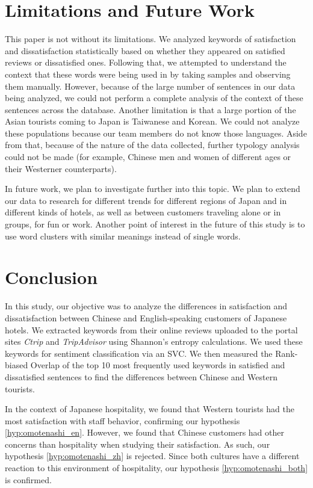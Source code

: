 \documentclass[smallextended,natbib]{svjour3}       %
\begin{document}
\section{Limitations and Future Work}\label{limitations}

This paper is not without its limitations. We analyzed keywords of satisfaction and dissatisfaction statistically based on whether they appeared on satisfied reviews or dissatisfied ones. Following that, we attempted to understand the context that these words were being used in by taking samples and observing them manually. However, because of the large number of sentences in our data being analyzed, we could not perform a complete analysis of the context of these sentences across the database. Another limitation is that a large portion of the Asian tourists coming to Japan is Taiwanese and Korean. We could not analyze these populations because our team members do not know those languages. Aside from that, because of the nature of the data collected, further typology analysis could not be made (for example, Chinese men and women of different ages or their Westerner counterparts).

In future work, we plan to investigate further into this topic. We plan to extend our data to research for different trends for different regions of Japan and in different kinds of hotels, as well as between customers traveling alone or in groups, for fun or work. Another point of interest in the future of this study is to use word clusters with similar meanings instead of single words. 

\section{Conclusion}\label{conclusion}

In this study, our objective was to analyze the differences in satisfaction and dissatisfaction between Chinese and English-speaking customers of Japanese hotels. We extracted keywords from their online reviews uploaded to the portal sites \textit{Ctrip} and \textit{TripAdvisor} using Shannon's entropy calculations. We used these keywords for sentiment classification via an SVC. We then measured the Rank-biased Overlap of the top 10 most frequently used keywords in satisfied and dissatisfied sentences to find the differences between Chinese and Western tourists. 

In the context of Japanese hospitality, we found that Western tourists had the most satisfaction with staff behavior, confirming our hypothesis \ref{hyp:omotenashi_en}. However, we found that Chinese customers had other concerns than hospitality when studying their satisfaction. As such, our hypothesis \ref{hyp:omotenashi_zh} is rejected. Since both cultures have a different reaction to this environment of hospitality, our hypothesis \ref{hyp:omotenashi_both} is confirmed.
\end{document}
